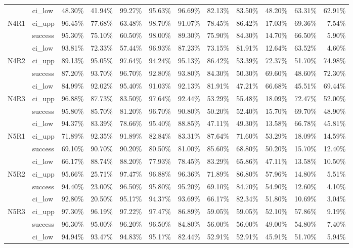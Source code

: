 \begin{tabular}{llrrrrrrrrrr}
     & ci\_low &      48.30\% & 41.94\% & 99.27\% & 95.63\% & 96.69\% &       82.13\% & 83.50\% & 48.20\% & 63.31\% & 62.91\% \\
N4R1 & ci\_upp &      96.45\% & 77.68\% & 63.48\% & 98.70\% & 91.07\% &       78.45\% & 86.42\% & 17.03\% & 69.36\% &  7.54\% \\
     & success &      95.30\% & 75.10\% & 60.50\% & 98.00\% & 89.30\% &       75.90\% & 84.30\% & 14.70\% & 66.50\% &  5.90\% \\
     & ci\_low &      93.81\% & 72.33\% & 57.44\% & 96.93\% & 87.23\% &       73.15\% & 81.91\% & 12.64\% & 63.52\% &  4.60\% \\
N4R2 & ci\_upp &      89.13\% & 95.05\% & 97.64\% & 94.24\% & 95.13\% &       86.42\% & 53.39\% & 72.37\% & 51.70\% & 74.98\% \\
     & success &      87.20\% & 93.70\% & 96.70\% & 92.80\% & 93.80\% &       84.30\% & 50.30\% & 69.60\% & 48.60\% & 72.30\% \\
     & ci\_low &      84.99\% & 92.02\% & 95.40\% & 91.03\% & 92.13\% &       81.91\% & 47.21\% & 66.68\% & 45.51\% & 69.44\% \\
N4R3 & ci\_upp &      96.88\% & 87.73\% & 83.50\% & 97.64\% & 92.44\% &       53.29\% & 55.48\% & 18.09\% & 72.47\% & 52.00\% \\
     & success &      95.80\% & 85.70\% & 81.20\% & 96.70\% & 90.80\% &       50.20\% & 52.40\% & 15.70\% & 69.70\% & 48.90\% \\
     & ci\_low &      94.37\% & 83.39\% & 78.66\% & 95.40\% & 88.85\% &       47.11\% & 49.30\% & 13.58\% & 66.78\% & 45.81\% \\
N5R1 & ci\_upp &      71.89\% & 92.35\% & 91.89\% & 82.84\% & 83.31\% &       87.64\% & 71.60\% & 53.29\% & 18.09\% & 14.59\% \\
     & success &      69.10\% & 90.70\% & 90.20\% & 80.50\% & 81.00\% &       85.60\% & 68.80\% & 50.20\% & 15.70\% & 12.40\% \\
     & ci\_low &      66.17\% & 88.74\% & 88.20\% & 77.93\% & 78.45\% &       83.29\% & 65.86\% & 47.11\% & 13.58\% & 10.50\% \\
N5R2 & ci\_upp &      95.66\% & 25.71\% & 97.47\% & 96.88\% & 96.36\% &       71.89\% & 86.80\% & 57.96\% & 14.80\% &  5.51\% \\
     & success &      94.40\% & 23.00\% & 96.50\% & 95.80\% & 95.20\% &       69.10\% & 84.70\% & 54.90\% & 12.60\% &  4.10\% \\
     & ci\_low &      92.80\% & 20.50\% & 95.17\% & 94.37\% & 93.69\% &       66.17\% & 82.34\% & 51.80\% & 10.69\% &  3.04\% \\
N5R3 & ci\_upp &      97.30\% & 96.19\% & 97.22\% & 97.47\% & 86.89\% &       59.05\% & 59.05\% & 52.10\% & 57.86\% &  9.19\% \\
     & success &      96.30\% & 95.00\% & 96.20\% & 96.50\% & 84.80\% &       56.00\% & 56.00\% & 49.00\% & 54.80\% &  7.40\% \\
     & ci\_low &      94.94\% & 93.47\% & 94.83\% & 95.17\% & 82.44\% &       52.91\% & 52.91\% & 45.91\% & 51.70\% &  5.94\% \\
\bottomrule
\end{tabular}

